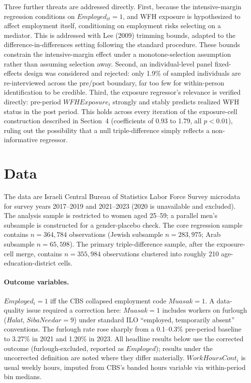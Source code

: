 \documentclass[11pt]{article}
\begin{document}
Three further threats are addressed directly. First, because the intensive-margin regression conditions on $Employed_{it}=1$, and WFH exposure is hypothesized to affect employment itself, conditioning on employment risks selecting on a mediator. This is addressed with Lee (2009) trimming bounds, adapted to the difference-in-differences setting following the standard procedure. These bounds constrain the intensive-margin effect under a monotone-selection assumption rather than assuming selection away. Second, an individual-level panel fixed-effects design was considered and rejected: only 1.9\% of sampled individuals are re-interviewed across the pre/post boundary, far too few for within-person identification to be credible. Third, the exposure regressor's relevance is verified directly: pre-period $WFHExposure_i$ strongly and stably predicts realized WFH status in the post period. This holds across every iteration of the exposure-cell construction described in Section~4 (coefficients of 0.93 to 1.79, all $p<0.01$), ruling out the possibility that a null triple-difference simply reflects a non-informative regressor.

\section{Data}

The data are Israeli Central Bureau of Statistics Labor Force Survey microdata for survey years 2017--2019 and 2021--2023 (2020 is unavailable and excluded). The analysis sample is restricted to women aged 25--59; a parallel men's subsample is constructed for a gender-placebo check. The core regression sample contains $n=364{,}784$ observations (Jewish subsample $n=283{,}975$; Arab subsample $n=65{,}598$). The primary triple-difference sample, after the exposure-cell merge, contains $n=355{,}984$ observations clustered into roughly 210 age-education-district cells.

\paragraph{Outcome variables.} $Employed_i=1$ iff the CBS collapsed employment code $Muasak=1$. A data-quality issue required a correction here: $Muasak=1$ includes workers on furlough (\textit{Halat}, $SibaNeedar=9$) under standard ILO ``employed, temporarily absent'' conventions. The furlough rate rose sharply from a 0.1--0.3\% pre-period baseline to 3.27\% in 2021 and 1.20\% in 2023. All headline results below use the corrected outcome (furlough-excluded, reported as $Employed$); results under the uncorrected definition are noted where they differ materially. $WorkHoursCont_i$ is usual weekly hours, imputed from CBS's banded hours variable via within-period bin medians.
\end{document}

